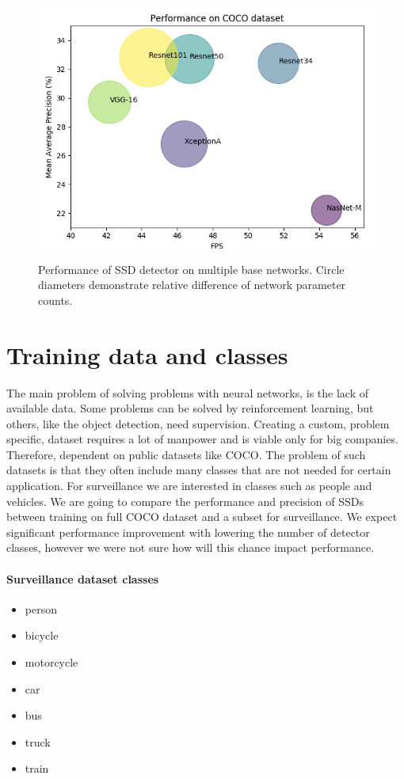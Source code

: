 \begin{figure}
    \centering
    \includegraphics[width=\textwidth]{img/coco_perf}
    \caption[Performance of SSD base networks on COCO dataset]{Performance of SSD detector on multiple base networks. Circle diameters demonstrate relative difference of network parameter counts.}
    \label{fig:cocoperf}
\end{figure}

\section{Training data and classes}
The main problem of solving problems with neural networks, is the lack of available data. Some problems can be solved by reinforcement learning, but others, like the object detection, need supervision. Creating a custom, problem specific, dataset requires a lot of manpower and is viable only for big companies. Therefore, dependent on public datasets like COCO. The problem of such datasets is that they often include many classes that are not needed for certain application. For surveillance we are interested in classes such as people and vehicles. We are going to compare the performance and precision of SSDs between training on full COCO dataset and a subset for surveillance. We expect significant performance improvement with lowering the number of detector classes, however we were not sure how will this chance impact performance. 

\paragraph{Surveillance dataset classes}
\begin{multicols}{2}
    \begin{itemize}
        \item person
        \item bicycle
        \item motorcycle
        \item car
        \item bus
        \item truck
        \item train
    \end{itemize}
\end{multicols}

